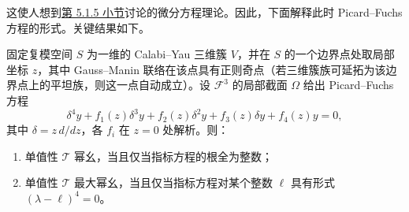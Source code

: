 这使人想到\hyperref[subsec:monodromy-pf]{第 5.1.5 小节}讨论的微分方程理论。因此，下面解释此时 Picard--Fuchs 方程的形式。关键结果如下。
\begin{proposition}\label{prop:mum-indicial-equation}
固定复模空间 $S$ 为一维的 Calabi--Yau 三维簇 $V$，并在 $S$ 的一个边界点处取局部坐标 $z$，其中 Gauss--Manin 联络在该点具有正则奇点（若三维簇族可延拓为该边界点上的平坦族，则这一点自动成立）。设 $\mathcal F^3$ 的局部截面 $\Omega$ 给出 Picard--Fuchs 方程
\[
\delta^4y+f_1(z)\delta^3y+f_2(z)\delta^2y
+f_3(z)\delta y+f_4(z)y=0,
\]
其中 $\delta=z\,d/dz$，各 $f_i$ 在 $z=0$ 处解析。则：
\begin{enumerate}[label=(\roman*)]
\item 单值性 $\mathcal T$ 幂幺，当且仅当指标方程的根全为整数；
\item 单值性 $\mathcal T$ 最大幂幺，当且仅当指标方程对某个整数 $\ell$ 具有形式 $(\lambda-\ell)^4=0$。
\end{enumerate}
\end{proposition}
